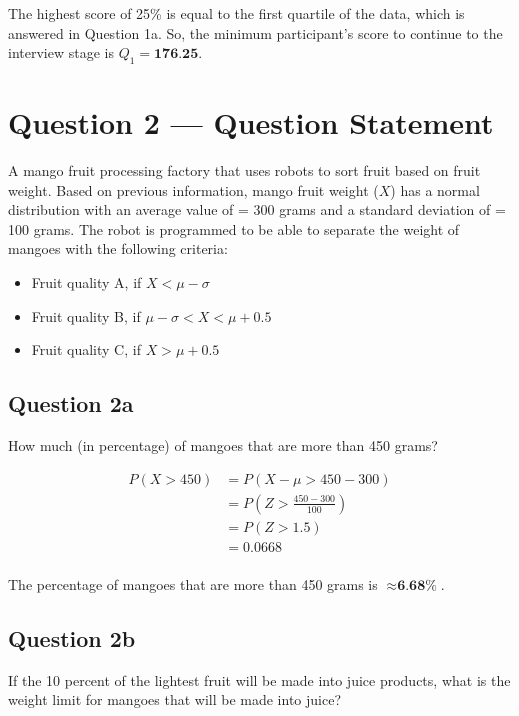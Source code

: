 \documentclass[
  11pt, %
]{assignment}
\begin{document}
The highest score of 25\% is equal to the first quartile of the data, which is answered in Question 1a. So, the minimum participant's score to continue to the interview stage is \(Q_1 = \textbf{176.25}\).


\section*{Question 2 --- Question Statement}

\begin{problem}
A mango fruit processing factory that uses robots to sort fruit based on fruit weight. Based on
previous information, mango fruit weight (\(X\)) has a normal distribution with an average value of = 300 grams and a standard deviation of = 100 grams. The robot is programmed to be able to separate the weight of mangoes with the following criteria:

\medskip

\begin{itemize}
  \item Fruit quality A, if \( X < \mu - \sigma \)
  \item Fruit quality B, if \( \mu - \sigma < X < \mu + 0.5 \)
  \item Fruit quality C, if \( X > \mu + 0.5 \)
\end{itemize}
\end{problem}

\subsection*{Question 2a}
\begin{problem}
How much (in percentage) of mangoes that are more than 450 grams?
\end{problem}

\begin{align*}
  P (X>450) & = P(X - \mu > 450 - 300)     \\
            & = P(Z > \frac{450-300}{100}) \\
            & = P(Z > 1.5)                 \\
            & = 0.0668                     \\
\end{align*}

The percentage of mangoes that are more than 450 grams is \( \approx \textbf{6.68\%} \).

\subsection*{Question 2b}
\begin{problem}
If the 10 percent of the lightest fruit will be made into juice products, what is the weight limit for mangoes that will be made into juice?
\end{problem}
\end{document}
